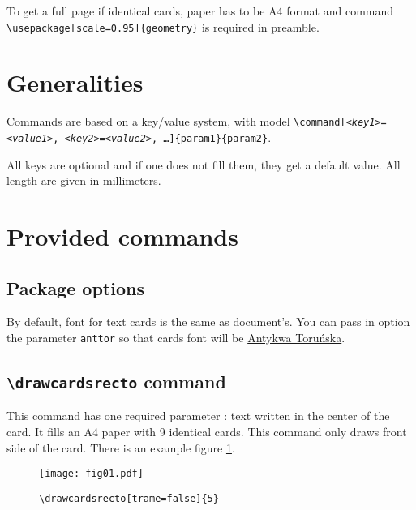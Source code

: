 \documentclass[a4paper, 12pt]{article}
\newcommand{\kv}[2]{\textit{<#1>}\texttt=\textit{<#2>}}
\newcommand{\commande}[1]{\texttt{\textbackslash#1}}
\begin{document}
To get a full page if identical cards, paper has to be A4 format and command \commande{usepackage[scale=0.95]\{geometry\}} is required in preamble.

\section{Generalities}
Commands are based on a key/value system, with model \texttt{\textbackslash command[\kv{key1}{value1}, \kv{key2}{value2}, …]\{param1\}\{param2\}}.

All keys are optional and if one does not fill them, they get a default value. All length are given in millimeters.

\section{Provided commands}
	\subsection{Package options}
By default, font for text cards is the same as document's. You can pass in option the parameter \texttt{anttor} so that cards font will be \href{https://tug.org/FontCatalogue/antykwatorunska/}{Antykwa Toruńska}.

	\subsection{\commande{drawcardsrecto} command}
This command has one required parameter : text written in the center of the card. It fills an A4 paper with 9 identical cards. This command only draws front side of the card. There is an example figure \ref{fig:recto}.
\begin{figure}[h]\begin{center}
	\caption{\commande{drawcardsrecto[trame=false]\{5\}}}
	\texttt{[image: fig01.pdf]}\label{fig:recto}
\end{center}\end{figure}
\end{document}
